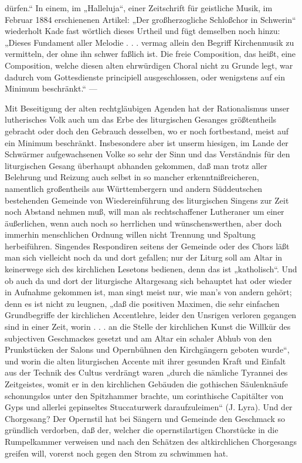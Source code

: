 dürfen.“ In einem, im „Halleluja“, einer Zeitschrift für geistliche Musik, im Februar 1884 erschienenen Artikel: „Der großherzogliche Schloßchor in Schwerin“ wiederholt Kade fast wörtlich dieses Urtheil und fügt demselben noch hinzu: „Dieses Fundament aller Melodie . . . vermag allein den Begriff Kirchenmusik zu vermitteln, der ohne ihn schwer faßlich ist. Die freie Composition, das heißt, eine Composition, welche diesen alten ehrwürdigen Choral nicht zu Grunde legt, war dadurch vom Gottesdienste principiell ausgeschlossen, oder wenigstens auf ein Minimum beschränkt.“ —

Mit Beseitigung der alten rechtgläubigen Agenden hat der Rationalismus unser lutherisches Volk auch um das Erbe des liturgischen Gesanges größtentheils gebracht oder doch den Gebrauch desselben, wo er noch fortbestand, meist auf ein Minimum beschränkt. Insbesondere aber ist unserm hiesigen, im Lande der Schwärmer aufgewachsenen Volke so sehr der Sinn und das Verständnis für den liturgischen Gesang überhaupt abhanden gekommen, daß man trotz aller Belehrung und Reizung auch selbst in so mancher erkenntnißreicheren, namentlich großentheils aus Württembergern und andern Süddeutschen bestehenden Gemeinde von Wiedereinführung des liturgischen Singens zur Zeit noch Abstand nehmen muß, will man als rechtschaffener Lutheraner um einer äußerlichen, wenn auch noch so herrlichen und wünschenswerthen, aber doch immerhin menschlichen Ordnung willen nicht Trennung und Spaltung herbeiführen. Singendes Respondiren seitens der Gemeinde oder des Chors läßt man sich vielleicht noch da und dort gefallen; nur der Liturg soll am Altar in keinerwege sich des kirchlichen Lesetons bedienen, denn das ist „katholisch“. Und ob auch da und dort der liturgische Altargesang sich behauptet hat oder wieder in Aufnahme gekommen ist, man singt meist nur, wie man's von andern gehört; denn es ist nicht zu leugnen, „daß die positiven Maximen, die sehr einfachen Grundbegriffe der kirchlichen Accentlehre, leider den Unsrigen verloren gegangen sind in einer Zeit, worin . . . an die Stelle der kirchlichen Kunst die Willkür des subjectiven Geschmackes gesetzt und am Altar ein schaler Abhub von den Prunkstücken der Salons und Opernbühnen den Kirchgängern geboten wurde“, und worin die alten liturgischen Accente mit ihrer gesunden Kraft und Einfalt aus der Technik des Cultus verdrängt waren „durch die nämliche Tyrannei des Zeitgeistes, womit er in den kirchlichen Gebäuden die gothischen Säulenknäufe schonungslos unter den Spitzhammer brachte, um corinthische Capitälter von Gyps und allerlei gepinseltes Stuccaturwerk daraufzuleimen“ (J. Lyra). Und der Chorgesang? Der Opernstil hat bei Sängern
und Gemeinde den Geschmack so gründlich verdorben, daß der, welcher die opernstilartigen Chorstücke in die Rumpelkammer verweisen und nach den Schätzen des altkirchlichen Chorgesangs greifen will, vorerst noch gegen den Strom zu schwimmen hat.

